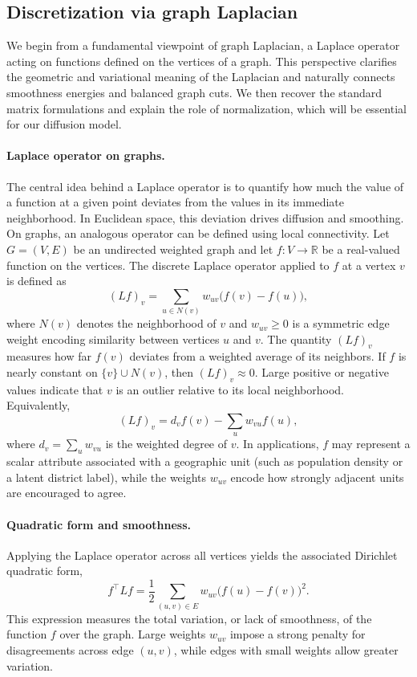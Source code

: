 \documentclass[11pt]{article}
\begin{document}
\subsection{Discretization via graph Laplacian}\label{sec:laplace}

We begin from a fundamental viewpoint of graph Laplacian, a Laplace operator acting on functions defined on the vertices of a graph. This perspective clarifies the geometric and variational meaning of the Laplacian and naturally connects smoothness energies and balanced graph cuts. We then recover the standard matrix formulations and explain the role of normalization, which will be essential for our diffusion model.

\paragraph{Laplace operator on graphs.}
The central idea behind a Laplace operator is to quantify how much the value of a function at a given point deviates from the values in its immediate neighborhood. In Euclidean space, this deviation drives diffusion and smoothing. On graphs, an analogous operator can be defined using local connectivity. Let $G=(V,E)$ be an undirected weighted graph and let $f : V \to \mathbb{R}$ be a real-valued function on the vertices. The discrete Laplace operator applied to $f$ at a vertex $v$ is defined as
\begin{equation} \label{eq:operator}
    (Lf)_v = \sum_{u \in N(v)} w_{uv}\bigl(f(v) - f(u)\bigr),
\end{equation}
where $N(v)$ denotes the neighborhood of $v$ and $w_{uv} \ge 0$ is a symmetric edge weight encoding similarity between vertices $u$ and $v$. The quantity $(Lf)_v$ measures how far $f(v)$ deviates from a weighted average of its neighbors. If $f$ is nearly constant on $\{v\} \cup N(v)$, then $(Lf)_v \approx 0$. Large positive or negative values indicate that $v$ is an outlier relative to its local neighborhood. Equivalently,
\[
(Lf)_v = d_v f(v) - \sum_{u} w_{vu} f(u),
\]
where $d_v = \sum_u w_{vu}$ is the weighted degree of $v$. In applications, $f$ may represent a scalar attribute associated with a geographic unit (such as population density or a latent district label), while the weights $w_{uv}$ encode how strongly adjacent units are encouraged to agree.

\paragraph{Quadratic form and smoothness.} Applying the Laplace operator across all vertices yields the associated Dirichlet quadratic form,
\begin{equation}\label{eq:quadform}
    f^\top L f 
    = \frac{1}{2}\sum_{(u,v) \in E} w_{uv}\bigl(f(u) - f(v)\bigr)^2.
\end{equation}
This expression measures the total variation, or lack of smoothness, of the function $f$ over the graph. Large weights $w_{uv}$ impose a strong penalty for disagreements across edge $(u,v)$, while edges with small weights allow greater variation.
\end{document}
